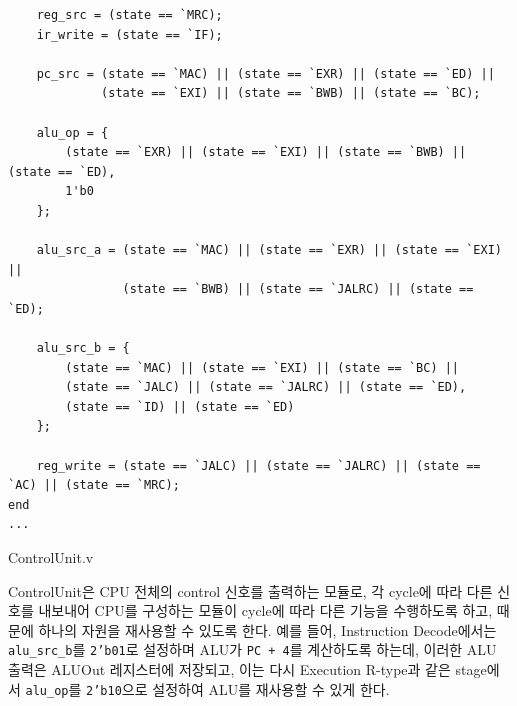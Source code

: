 \documentclass[openright, a4paper]{article}
\newenvironment{longlisting}{\captionsetup{type=listing}}{}
\newcommand{\code}[1]{\texttt{#1}}
\begin{document}
\begin{longlisting}
\begin{verbatim}
    reg_src = (state == `MRC);
    ir_write = (state == `IF);

    pc_src = (state == `MAC) || (state == `EXR) || (state == `ED) ||
             (state == `EXI) || (state == `BWB) || (state == `BC);

    alu_op = {
        (state == `EXR) || (state == `EXI) || (state == `BWB) || (state == `ED),
        1'b0
    };

    alu_src_a = (state == `MAC) || (state == `EXR) || (state == `EXI) ||
                (state == `BWB) || (state == `JALRC) || (state == `ED);

    alu_src_b = {
        (state == `MAC) || (state == `EXI) || (state == `BC) || 
        (state == `JALC) || (state == `JALRC) || (state == `ED),
        (state == `ID) || (state == `ED)
    };

    reg_write = (state == `JALC) || (state == `JALRC) || (state == `AC) || (state == `MRC);
end
...
    \end{verbatim}
    \caption{ControlUnit.v}
\end{longlisting}
\break

ControlUnit은 CPU 전체의 control 신호를 출력하는 모듈로, 각 cycle에 따라 다른
신호를 내보내어 CPU를 구성하는 모듈이 cycle에 따라 다른 기능을 수행하도록 하고, 
때문에 하나의 자원을 재사용할 수 있도록 한다. 예를 들어, Instruction 
Decode에서는 \code{alu_src_b}를 \code{2'b01}로 설정하며 ALU가 \code{PC + 4}를
계산하도록 하는데, 이러한 ALU 출력은 ALUOut 레지스터에 저장되고, 이는 다시
Execution R-type과 같은 stage에서 \code{alu_op}를 \code{2'b10}으로 설정하여
ALU를 재사용할 수 있게 한다.
\end{document}
